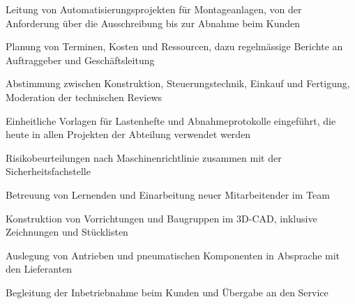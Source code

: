 \documentclass[cv,de,rueckgrat,v2,schmal,duenn,ohnepfeil,rand15,ruhig,schluesselspalte,name25,kopftausch]{rueckgrat}
\begin{document}
\cvheader


\begin{cvbullets}
  \item Leitung von Automatisierungsprojekten für Montageanlagen, von der Anforderung über die Ausschreibung bis zur Abnahme beim Kunden
  \item Planung von Terminen, Kosten und Ressourcen, dazu regelmässige Berichte an Auftraggeber und Geschäftsleitung
  \item Abstimmung zwischen Konstruktion, Steuerungstechnik, Einkauf und Fertigung, Moderation der technischen Reviews
  \item Einheitliche Vorlagen für Lastenhefte und Abnahmeprotokolle eingeführt, die heute in allen Projekten der Abteilung verwendet werden
  \item Risikobeurteilungen nach Maschinenrichtlinie zusammen mit der Sicherheitsfachstelle
  \item Betreuung von Lernenden und Einarbeitung neuer Mitarbeitender im Team
\end{cvbullets}
\begin{cvbullets}
  \item Konstruktion von Vorrichtungen und Baugruppen im 3D-CAD, inklusive Zeichnungen und Stücklisten
  \item Auslegung von Antrieben und pneumatischen Komponenten in Absprache mit den Lieferanten
  \item Begleitung der Inbetriebnahme beim Kunden und Übergabe an den Service
\end{cvbullets}
\end{document}
